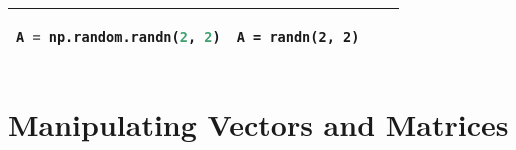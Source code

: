\documentclass[]{article}
\begin{document}
\begin{longtable}[]{@{}llll@{}}
\begin{minipage}[t]{0.25\columnwidth}
\begin{lstlisting}[language=Python]
A = np.random.randn(2, 2)
\end{lstlisting}
\strut
\end{minipage} & \begin{minipage}[t]{0.20\columnwidth}\raggedright\strut
\begin{lstlisting}
A = randn(2, 2)
\end{lstlisting}
\strut
\end{minipage}\tabularnewline
\bottomrule
\end{longtable}

\section{Manipulating Vectors and
Matrices}\label{manipulating-vectors-and-matrices}
\end{document}
